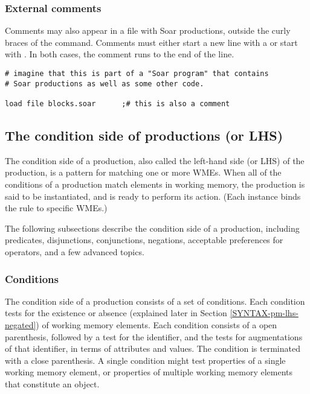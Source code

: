 \subsubsection*{External comments}

Comments may also appear in a file with Soar productions, outside  the curly braces of the  command.  Comments must either start a new line with a \soar{\#} or start with \soar{;\#}. In both cases, the comment runs to the end of the line.

\begin{verbatim}
# imagine that this is part of a "Soar program" that contains
# Soar productions as well as some other code.

load file blocks.soar      ;# this is also a comment
\end{verbatim}


\subsection{The condition side of productions (or LHS)}
\label{SYNTAX-pm-lhs}

The condition side of a production, also called the left-hand side (or LHS) of the production, is a pattern for matching one or more WMEs. When all of the conditions of a production match elements in working memory, the production is said to be instantiated, and is ready to perform its action. (Each instance binds the rule to specific WMEs.)

The following subsections describe the condition side of a production, including predicates, disjunctions, conjunctions, negations, acceptable preferences for operators, and a few advanced topics.

\subsubsection{Conditions}
\label{SYNTAX-pm-lhs-conditions}

The condition side of a production consists of a set of conditions. Each condition tests for the existence or absence (explained later in Section \ref{SYNTAX-pm-lhs-negated}) of working memory elements. Each condition consists of a open parenthesis, followed by a test for the identifier, and the tests for augmentations of that identifier, in terms of attributes and values.  The condition is terminated with a close parenthesis. A single condition might test properties of a single working memory element, or properties of multiple working memory elements that constitute an object.

